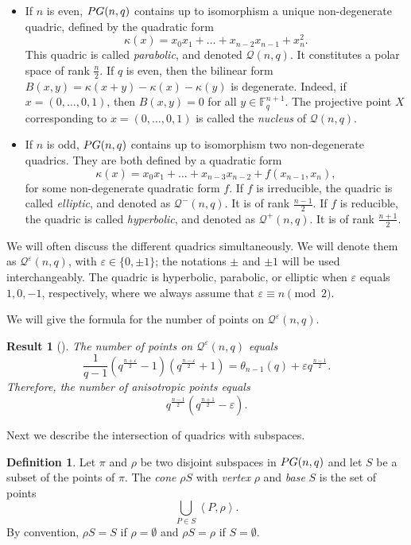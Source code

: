 \documentclass[a4paper]{article}
\newtheorem{res}[thm]{Result}
\theoremstyle{definition}
\newtheorem{df}[thm]{Definition}
\newcommand{\eps}{\varepsilon}
\newcommand{\FF}{\mathbb F}
\newcommand{\vspan}[1]{\left \langle #1 \right \rangle}
\newcommand{\pg}{\textnormal{PG}}
\newcommand{\mq}{\mathcal Q}
\begin{document}
\begin{itemize}
 \item If $n$ is even, $\pg(n,q)$ contains up to isomorphism a unique non-degenerate quadric, defined by the quadratic form
\[
 \kappa(x) = x_0 x_1 + \ldots + x_{n-2} x_{n-1} + x_n^2.
\]
This quadric is called \emph{parabolic}, and denoted $\mq(n,q)$.
It constitutes a polar space of rank $\frac n2$.
If $q$ is even, then the bilinear form $B(x,y) = \kappa(x+y) - \kappa(x) - \kappa(y)$ is degenerate.
Indeed, if $x=(0,\dots,0,1)$, then $B(x,y) = 0$ for all $y \in \FF_q^{n+1}$.
The projective point $X$ corresponding to $x=(0,\dots,0,1)$ is called the \emph{nucleus} of $\mq(n,q)$.

 \item If $n$ is odd, $\pg(n,q)$ contains up to isomorphism two non-degenerate quadrics.
They are both defined by a quadratic form%
\[
 \kappa(x) = x_0 x_1 + \ldots + x_{n-3} x_{n-2} + f(x_{n-1},x_n),
\]
for some non-degenerate quadratic form $f$.
If $f$ is irreducible, the quadric is called \emph{elliptic}, and denoted as $\mq^-(n,q)$.
It is of rank $\frac {n-1}2$.
If $f$ is reducible, the quadric is called \emph{hyperbolic}, and denoted as $\mq^+(n,q)$.
It is of rank $\frac {n+1}2$.
\end{itemize}

We will often discuss the different quadrics simultaneously.
We will denote them as $\mq^\eps(n,q)$, with $\eps \in \{0, \pm 1\}$; the notations $\pm$ and $\pm 1$ will be used interchangeably.
The quadric is hyperbolic, parabolic, or elliptic when $\eps$ equals $1,0,-1$, respectively, where we always assume that $\eps \equiv n \pmod 2$.

We will give the formula for the number of points on $\mq^\eps(n,q)$.

\begin{res}[{\cite[Theorem 1.41]{hirschfeldthas}}]
 \label{ResQuadricSize}
 The number of points on $\mq^\eps(n,q)$ equals
 \[
  \frac 1 {q-1} \left( q^\frac{n+\eps}2 - 1 \right) \left( q^\frac{n-\eps}2 + 1 \right) = \theta_{n-1}(q) + \eps q^\frac{n-1}2.
 \]
 Therefore, the number of anisotropic points equals
 \[
  q^\frac{n-1}2 \left( q^\frac{n+1}2 - \eps \right).
 \]
\end{res}

Next we describe the intersection of quadrics with subspaces.

\begin{df}
 Let $\pi$ and $\rho$ be two disjoint subspaces in $\pg(n,q)$ and let $S$ be a subset of the points of $\pi$.
 The \emph{cone} $\rho S$ with \emph{vertex} $\rho$ and \emph{base} $S$ is the set of points
 \[
  \bigcup_{P \in S} \vspan{P,\rho}.
 \]
 By convention, $\rho S = S$ if $\rho = \emptyset$ and $\rho S = \rho$ if $S = \emptyset$.
\end{df}
\end{document}
